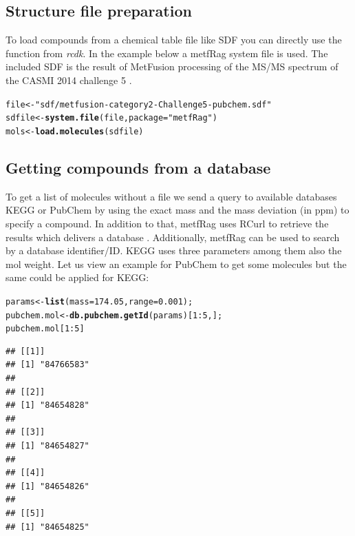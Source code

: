 \documentclass[12pt, a4paper]{scrartcl}\usepackage[]{graphicx}\usepackage[]{color}
\makeatletter
\newcommand{\hlnum}[1]{\textcolor[rgb]{0.686,0.059,0.569}{#1}}%
\newcommand{\hlstr}[1]{\textcolor[rgb]{0.192,0.494,0.8}{#1}}%
\newcommand{\hlopt}[1]{\textcolor[rgb]{0,0,0}{#1}}%
\newcommand{\hlstd}[1]{\textcolor[rgb]{0.345,0.345,0.345}{#1}}%
\newcommand{\hlkwb}[1]{\textcolor[rgb]{0.69,0.353,0.396}{#1}}%
\newcommand{\hlkwc}[1]{\textcolor[rgb]{0.333,0.667,0.333}{#1}}%
\newcommand{\hlkwd}[1]{\textcolor[rgb]{0.737,0.353,0.396}{\textbf{#1}}}%
\newenvironment{kframe}{%
 \def\at@end@of@kframe{}%
 \ifinner\ifhmode%
  \def\at@end@of@kframe{\end{minipage}}%
  \begin{minipage}{\columnwidth}%
 \fi\fi%
 \def\FrameCommand##1{\hskip\@totalleftmargin \hskip-\fboxsep
 \colorbox{shadecolor}{##1}\hskip-\fboxsep
     \hskip-\linewidth \hskip-\@totalleftmargin \hskip\columnwidth}%
 \MakeFramed {\advance\hsize-\width
   \@totalleftmargin\z@ \linewidth\hsize
   \@setminipage}}%
 {\par\unskip\endMakeFramed%
 \at@end@of@kframe}
\newenvironment{knitrout}{}{} %
\newcommand{\Rpackage}[1]{{\textit{#1}}}
\makeatother
\begin{document}
\subsection{Structure file preparation}
To load compounds from a chemical table file like SDF you can directly use the 
function from \Rpackage{rcdk}. In the example below a metfRag system file is used. The included SDF 
is the result of MetFusion processing of the MS/MS spectrum of the CASMI 2014 challenge 5 \cite{Guha2007}.
\begin{knitrout}
\color{fgcolor}\begin{kframe}
\begin{alltt}
\hlstd{file} \hlkwb{<-} \hlstr{"sdf/metfusion-category2-Challenge5-pubchem.sdf"}
\hlstd{sdfile} \hlkwb{<-} \hlkwd{system.file}\hlstd{(file,} \hlkwc{package} \hlstd{=} \hlstr{"metfRag"}\hlstd{)}
\hlstd{mols} \hlkwb{<-} \hlkwd{load.molecules}\hlstd{(sdfile)}
\end{alltt}
\end{kframe}
\end{knitrout}
\subsection{Getting compounds from a database}
To get a list of molecules without a file we send a query to available 
databases KEGG or PubChem by using the exact mass and the mass deviation (in ppm) to specify a compound. In addition to that, metfRag uses RCurl to retrieve the results which delivers a database \cite{Lang2013a}.
Additionally, metfRag can be used to search by a database identifier/ID. KEGG uses three parameters among them also the mol weight. Let us view an example for PubChem to get some molecules but the same could be applied for KEGG:

\begin{knitrout}
\color{fgcolor}\begin{kframe}
\begin{alltt}
\hlstd{params} \hlkwb{<-} \hlkwd{list}\hlstd{(}\hlkwc{mass}\hlstd{=}\hlnum{174.05}\hlstd{,} \hlkwc{range}\hlstd{=}\hlnum{0.001}\hlstd{);}
\hlstd{pubchem.mol} \hlkwb{<-} \hlkwd{db.pubchem.getId}\hlstd{(params)[}\hlnum{1}\hlopt{:}\hlnum{5}\hlstd{,];}
\hlstd{pubchem.mol[}\hlnum{1}\hlopt{:}\hlnum{5}\hlstd{]}
\end{alltt}
\begin{verbatim}
## [[1]]
## [1] "84766583"
## 
## [[2]]
## [1] "84654828"
## 
## [[3]]
## [1] "84654827"
## 
## [[4]]
## [1] "84654826"
## 
## [[5]]
## [1] "84654825"
\end{verbatim}
\end{kframe}
\end{knitrout}
\end{document}
